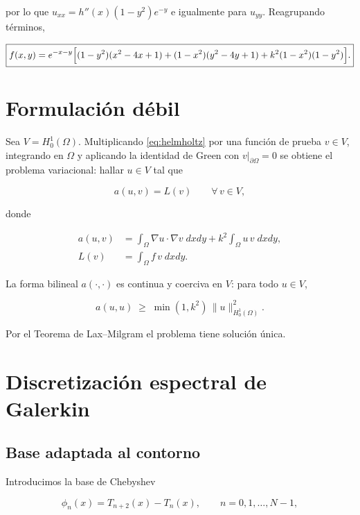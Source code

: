 \documentclass[11pt,a4paper,twoside,pdf]{article}
\numberwithin{equation}{section}
\begin{document}
por lo que $u_{xx} = h''(x)(1-y^{2})e^{-y}$ e igualmente para
$u_{yy}$. Reagrupando términos,

\begin{equation}
\label{eq:fsource}
\boxed{
f(x,y) = e^{-x-y}
\Bigl[
(1-y^{2})(x^{2} - 4x + 1)
+ (1-x^{2})(y^{2} - 4y + 1)
+ k^{2}(1-x^{2})(1-y^{2})
\Bigr].
}
\end{equation}

\section{Formulación débil}
\label{sec:weak}

Sea $V = H^{1}_{0}(\Omega)$. Multiplicando \eqref{eq:helmholtz} por
una función de prueba $v \in V$, integrando en $\Omega$ y aplicando
la identidad de Green con $v|_{\partial\Omega} = 0$ se obtiene el
problema variacional: hallar $u \in V$ tal que

\begin{equation}
\label{eq:weak}
a(u,v) = L(v) \qquad \forall\, v \in V,
\end{equation}

donde

\begin{align}
a(u,v) &=
\int_{\Omega} \nabla u \cdot \nabla v \; dxdy
+ k^{2} \int_{\Omega} u \, v \; dxdy,
\\[4pt]
L(v) &= \int_{\Omega} f \, v \; dxdy.
\end{align}

La forma bilineal $a(\cdot,\cdot)$ es continua y coerciva en $V$: para
todo $u \in V$,

\[
a(u,u) \;\geq\; \min(1, k^{2})\, \|u\|_{H^{1}_{0}(\Omega)}^{2}.
\]

Por el Teorema de Lax--Milgram \cite{ern2004theory} el problema tiene
solución única.

\section{Discretización espectral de Galerkin}
\label{sec:galerkin}

\subsection{Base adaptada al contorno}

Introducimos la base de Chebyshev

\begin{equation}
\phi_{n}(x) = T_{n+2}(x) - T_{n}(x),
\qquad n = 0, 1, \dots, N-1,
\end{equation}
\end{document}
